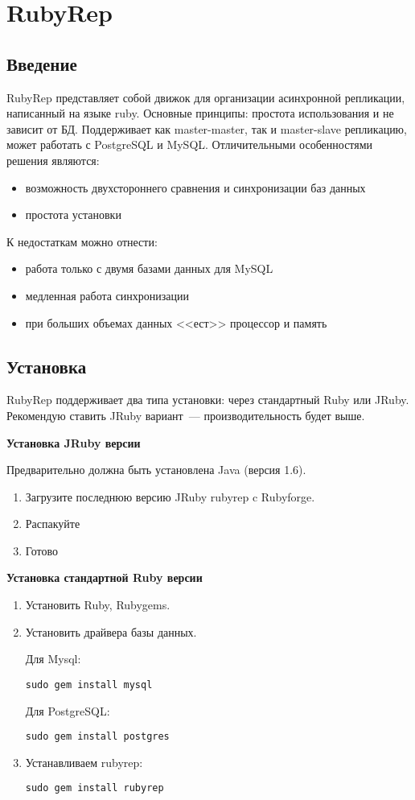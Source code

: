 \section{RubyRep}
\subsection{Введение}
RubyRep представляет собой движок для организации асинхронной репликации, написанный на языке ruby. 
Основные принципы: простота использования и не зависит от БД. 
Поддерживает как master-master, так и master-slave репликацию, может работать с PostgreSQL и MySQL.
Отличительными особенностями решения являются:
\begin{itemize}
\item возможность двухстороннего сравнения и синхронизации баз данных
\item простота установки
\end{itemize}
К недостаткам можно отнести:
\begin{itemize}
\item работа только с двумя базами данных для MySQL
\item медленная работа синхронизации 
\item при больших объемах данных <<ест>> процессор и память
\end{itemize}


\subsection{Установка}
RubyRep поддерживает два типа установки: через стандартный Ruby или JRuby. 
Рекомендую ставить JRuby вариант~--- производительность будет выше.

\textbf{Установка JRuby версии}

Предварительно должна быть установлена Java (версия 1.6).
\begin{enumerate}
 \item Загрузите последнюю версию JRuby rubyrep c Rubyforge.
 \item Распакуйте
 \item Готово
\end{enumerate}

\textbf{Установка стандартной Ruby версии}
\begin{enumerate}
\item Установить Ruby, Rubygems.
\item Установить драйвера базы данных.

Для Mysql: 
\begin{lstlisting}[label=lst:rubyrep1,caption=Установка]
sudo gem install mysql
\end{lstlisting}

Для PostgreSQL:
\begin{lstlisting}[label=lst:rubyrep2,caption=Установка]
sudo gem install postgres
\end{lstlisting}

\item Устанавливаем rubyrep:
\begin{lstlisting}[label=lst:rubyrep3,caption=Установка]
sudo gem install rubyrep
\end{lstlisting}
\end{enumerate}


